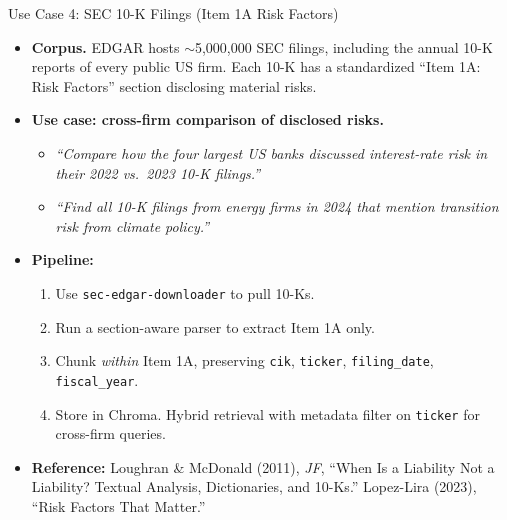 \documentclass[10pt,english,aspectratio=169]{beamer}
\begin{document}
\begin{frame}{Use Case 4: SEC 10-K Filings (Item 1A Risk Factors)}
\begin{itemize}
\item \textbf{Corpus.} EDGAR hosts $\sim$5{,}000{,}000 SEC filings, including the annual 10-K reports of every public US firm. Each 10-K has a standardized ``Item 1A: Risk Factors'' section disclosing material risks.

\medskip
\item \textbf{Use case: cross-firm comparison of disclosed risks.}
\begin{itemize}
    \item \emph{``Compare how the four largest US banks discussed interest-rate risk in their 2022 vs.\ 2023 10-K filings.''}
    \item \emph{``Find all 10-K filings from energy firms in 2024 that mention transition risk from climate policy.''}
\end{itemize}

\medskip
\item \textbf{Pipeline:}
\begin{enumerate}
    \item Use \texttt{sec-edgar-downloader} to pull 10-Ks.
    \item Run a section-aware parser to extract Item 1A only.
    \item Chunk \emph{within} Item 1A, preserving \texttt{cik}, \texttt{ticker}, \texttt{filing\_date}, \texttt{fiscal\_year}.
    \item Store in Chroma. Hybrid retrieval with metadata filter on \texttt{ticker} for cross-firm queries.
\end{enumerate}

\medskip
\item \textbf{Reference:} Loughran \& McDonald (2011), \emph{JF}, ``When Is a Liability Not a Liability? Textual Analysis, Dictionaries, and 10-Ks.'' Lopez-Lira (2023), ``Risk Factors That Matter.''
\end{itemize}
\end{frame}
\end{document}
